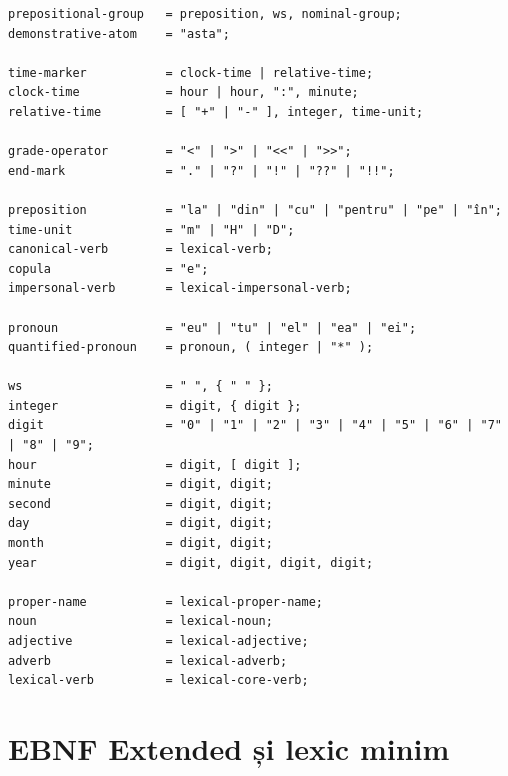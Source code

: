 \documentclass[12pt,onecolumn,letterpaper]{article}
\begin{document}
\begin{verbatim}
prepositional-group   = preposition, ws, nominal-group;
demonstrative-atom    = "asta";

time-marker           = clock-time | relative-time;
clock-time            = hour | hour, ":", minute;
relative-time         = [ "+" | "-" ], integer, time-unit;

grade-operator        = "<" | ">" | "<<" | ">>";
end-mark              = "." | "?" | "!" | "??" | "!!";

preposition           = "la" | "din" | "cu" | "pentru" | "pe" | "în";
time-unit             = "m" | "H" | "D";
canonical-verb        = lexical-verb;
copula                = "e";
impersonal-verb       = lexical-impersonal-verb;

pronoun               = "eu" | "tu" | "el" | "ea" | "ei";
quantified-pronoun    = pronoun, ( integer | "*" );

ws                    = " ", { " " };
integer               = digit, { digit };
digit                 = "0" | "1" | "2" | "3" | "4" | "5" | "6" | "7" | "8" | "9";
hour                  = digit, [ digit ];
minute                = digit, digit;
second                = digit, digit;
day                   = digit, digit;
month                 = digit, digit;
year                  = digit, digit, digit, digit;

proper-name           = lexical-proper-name;
noun                  = lexical-noun;
adjective             = lexical-adjective;
adverb                = lexical-adverb;
lexical-verb          = lexical-core-verb;
\end{verbatim}
\normalsize

\section{EBNF Extended și lexic minim}
\end{document}
